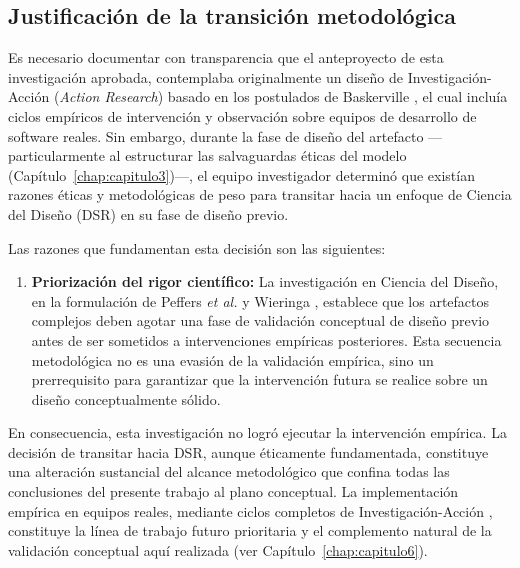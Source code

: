 \subsection{Justificación de la transición metodológica}
\label{sec:transicion-metodologica}

Es necesario documentar con transparencia que el anteproyecto de esta investigación aprobada, contemplaba originalmente un diseño de Investigación-Acción (\textit{Action Research}) basado en los postulados de Baskerville \cite{baskerville1999actionresearch}, el cual incluía ciclos empíricos de intervención y observación sobre equipos de desarrollo de software reales. Sin embargo, durante la fase de diseño del artefacto ---particularmente al estructurar las salvaguardas éticas del modelo (Capítulo~\ref{chap:capitulo3})---, el equipo investigador determinó que existían razones éticas y metodológicas de peso para transitar hacia un enfoque de Ciencia del Diseño (DSR) en su fase de diseño previo.

Las razones que fundamentan esta decisión son las siguientes:

\begin{enumerate}
    \item \textbf{Priorización del rigor científico:} La investigación en Ciencia del Diseño, en la formulación de Peffers \textit{et al.} \cite{peffers2007dsrm} y Wieringa \cite{wieringa2014dsr}, establece que los artefactos complejos deben agotar una fase de validación conceptual de diseño previo antes de ser sometidos a intervenciones empíricas posteriores. Esta secuencia metodológica no es una evasión de la validación empírica, sino un prerrequisito para garantizar que la intervención futura se realice sobre un diseño conceptualmente sólido.
\end{enumerate}

En consecuencia, esta investigación no logró ejecutar la intervención empírica. La decisión de transitar hacia DSR, aunque éticamente fundamentada, constituye una alteración sustancial del alcance metodológico que confina todas las conclusiones del presente trabajo al plano conceptual. La implementación empírica en equipos reales, mediante ciclos completos de Investigación-Acción \cite{baskerville1999actionresearch}, constituye la línea de trabajo futuro prioritaria y el complemento natural de la validación conceptual aquí realizada (ver Capítulo~\ref{chap:capitulo6}).

